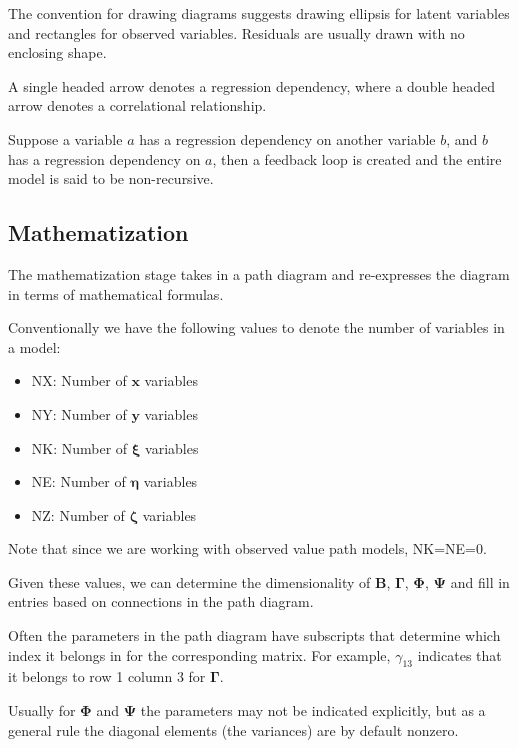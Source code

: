 \documentclass{article}
\begin{document}
\begin{multicols*}{2}
The convention for drawing diagrams suggests drawing ellipsis for latent variables and rectangles for observed variables. Residuals are usually drawn with no enclosing shape.


A single headed arrow denotes a regression dependency, where a double headed arrow denotes a correlational relationship.

Suppose a variable $a$ has a regression dependency on another variable $b$, and $b$ has a regression dependency on $a$, then a feedback loop is created and the entire model is said to be non-recursive.

\subsection{Mathematization}

The mathematization stage takes in a path diagram and re-expresses the diagram in terms of mathematical formulas.

Conventionally we have the following values to denote the number of variables in a model:

\begin{itemize}
    \item NX: Number of $\mathbf{x}$ variables
    \item NY: Number of $\mathbf{y}$ variables
    \item NK: Number of $\mathbf{\xi}$ variables
    \item NE: Number of $\mathbf{\eta}$ variables
    \item NZ: Number of $\mathbf{\zeta}$ variables
\end{itemize}

Note that since we are working with observed value path models, NK=NE=0.

Given these values, we can determine the dimensionality of $\mathbf{B}$, $\mathbf{\Gamma}$, $\mathbf{\Phi}$, $\mathbf{\Psi}$ and fill in entries based on connections in the path diagram. 

Often the parameters in the path diagram have subscripts that determine which index it belongs in for the corresponding matrix. For example, $\gamma_{13}$ indicates that it belongs to row 1 column 3 for $\mathbf{\Gamma}$.

Usually for $\mathbf{\Phi}$ and $\mathbf{\Psi}$ the parameters may not be indicated explicitly, but as a general rule the diagonal elements (the variances) are by default nonzero.


\end{multicols*}
\end{document}

